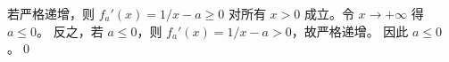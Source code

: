 若严格递增，则 $f_a'(x)=1/x-a\ge0$ 对所有 $x>0$ 成立。令 $x\to+\infty$ 得 $a\le0$。
反之，若 $a\le0$，则 $f_a'(x)=1/x-a>0$，故严格递增。
因此 $\boxed{a\le0}$。\qed
